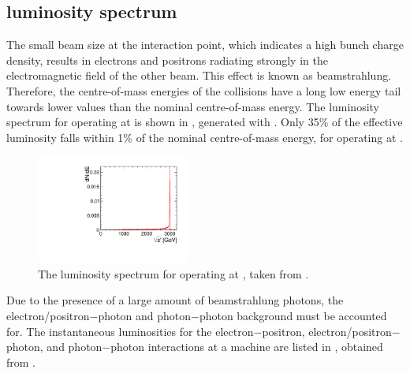 



\subsection{\CLIC luminosity spectrum}
\label{sec:pandoraCLUClumi}

The small \CLIC beam size  at the interaction point, which indicates a high bunch charge density, results in electrons and positrons radiating strongly in the electromagnetic field of the other beam. This effect is known as beamstrahlung. Therefore, the centre-of-mass energies of the \ee collisions  have a long low energy tail towards lower values than the nominal centre-of-mass energy. The luminosity spectrum for \CLIC operating at  is shown in , generated with \Guineapig \cite{Schulte:1999tx}. Only 35\% of the effective luminosity falls within 1\% of the nominal centre-of-mass energy, for \CLIC operating at .

\begin{figure}[tbph]
\centering
    \includegraphics[width=0.45\textwidth]{pandora/Lumi3TeV_fixed_nopeak.pdf}
\caption
{The luminosity spectrum for \CLIC operating at , taken from \cite{Linssen:2012hp}.}
\label{fig:pandoraCLICLumiSpec}
\end{figure}

Due to the presence of a large amount of beamstrahlung photons, the electron/positron$-$photon and photon$-$photon background must be accounted for. The instantaneous luminosities for the electron$-$positron,  electron/positron$-$photon, and photon$-$photon interactions  at a  \CLIC machine are listed in , obtained from \Guineapig.

